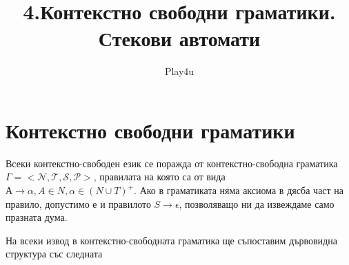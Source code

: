 \documentclass[11pt]{article} %
\title{4.Контекстно свободни граматики. Стекови автомати}
\author{Play4u}
\begin{document}
\maketitle

\newcommand{\lrangle}[1]{\left\langle #1 \right\rangle}

\newcommand{\belongsTo}{\in}
\newcommand{\notBelongsTo}{\centernot\in}

\newcommand{\oversetModels}[1]{\overset{#1}{\models}}

\newcommand{\kda}{A = <Q, X, q_{0}, \delta, F>}
\newcommand{\cfg}{\Gamma = <\mathcal{N}, \mathcal{T}, \mathcal{S}, \mathcal{P}>}
\newcommand{\cfgVers}{G = \langle V, \Sigma, R, S \rangle}
\newcommand{\nsa}{A = <Q, X, Z, q_{0}, z_{0}, \delta, F>}

\newcommand{\italicBold}[1]{\textbf{\emph{#1}}}
\newcommand{\definition}{\italicBold{Дефиниция: }}
\newcommand{\theorem}{\italicBold{Теорема: }}
\newcommand{\lemma}{\italicBold{Лема: }}
\newcommand{\proof}{\italicBold{Доказателство: }}

\newcommand{\curlies}[1]{\{#1\}}

\newcommand{\enumNum}{\renewcommand{\theenumi}{\arabic{enumi}}}
\newcommand{\enumlet}{\renewcommand{\theenumi}{\alph{enumi}}}

\section{Контекстно свободни граматики}
Всеки контекстно-свободен език се поражда от контекстно-свободна граматика $\cfg$, правилата на която са от вида $А \to \alpha, A \in N, \alpha \in (N \cup T)^{+}$.
Ако в граматиката няма аксиома в дясба част на правило, допустимо е и правилото $S \to \epsilon$, позволяващо ни да извеждаме само празната дума. \par

На всеки извод в контекстно-свободната граматика ще  съпоставим дървовидна структура със следната 
\end{document}
